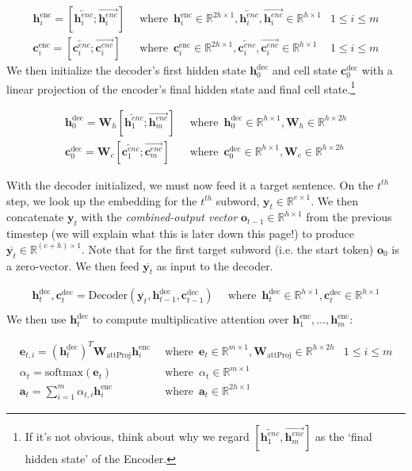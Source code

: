\documentclass{assignment format}
\newcommand{\Real}{\mathbb{R}}
\newcommand{\henc}{\mathbf{h}^{\text{enc}}}
\newcommand{\hencfw}[1]{\overrightarrow{\mathbf{h}^{enc}_{#1}}}
\newcommand{\hencbw}[1]{\overleftarrow{\mathbf{h}^{enc}_{#1}}}
\newcommand{\cenc}{\mathbf{c}^{\text{enc}}}
\newcommand{\cencfw}[1]{\overrightarrow{\mathbf{c}^{enc}_{#1}}}
\newcommand{\cencbw}[1]{\overleftarrow{\mathbf{c}^{enc}_{#1}}}
\newcommand{\hdec}{\mathbf{h}^{\text{dec}}}
\newcommand{\cdec}{\mathbf{c}^{\text{dec}}}
\begin{document}
\begin{align}
    \henc_i = [\hencbw{i}; \hencfw{i}] \enspace &\text{where}\enspace \henc_i \in \Real^{2h \times 1}, \hencbw{i}, \hencfw{i} \in \Real^{h \times 1} &1 \le i \le m \\
    \cenc_i = [\cencbw{i}; \cencfw{i}] \enspace &\text{where} \enspace \cenc_i \in \Real^{2h \times 1}, \cencbw{i}, \cencfw{i} \in \Real^{h \times 1} &1 \le i \le m
\end{align}
We then initialize the decoder's first hidden state $\hdec_0$ and cell state $\cdec_0$ with a linear projection of the encoder's final hidden state and final cell state.\footnote{If it's not obvious, think about why we regard $[\hencbw{1}, \hencfw{m}]$ as the `final hidden state' of the Encoder.} 

\begin{align}
    \hdec_0 = \mathbf{W}_{h}[\hencbw{1}; \hencfw{m}] \enspace &\text{where} \enspace \hdec_0 \in \Real^{h \times 1}, \mathbf{W}_{h} \in \Real^{h \times 2h}\\
    \cdec_0 = \mathbf{W}_{c}[\cencbw{1}; \cencfw{m}] \enspace &\text{where} \enspace \cdec_0 \in \Real^{h \times 1}, \mathbf{W}_{c} \in \Real^{h \times 2h}
\end{align}


With the decoder initialized, we must now feed it a target sentence. On the $t^{th}$ step, we look up the embedding for the $t^{th}$ subword,  $\mathbf{y}_t \in \Real^{e \times 1}$. We then concatenate $\mathbf{y}_t$ with the \textit{combined-output vector} $\mathbf{o}_{t-1} \in \Real^{h \times 1}$ from the previous timestep (we will explain what this is later down this page!\@) to produce $\overline{\mathbf{y}_t} \in \Real^{(e+h) \times 1}$. Note that for the first target subword (i.e. the start token) $\mathbf{o}_{0}$ is a zero-vector. We then feed $\overline{\mathbf{y}_t}$ as input to the decoder. 

\begin{align}
    \hdec_t, \cdec_t = \text{Decoder}(\overline{\mathbf{y}_t}, \hdec_{t-1}, \cdec_{t-1}) \enspace &\text{where} \enspace \hdec_t \in \Real^{h \times 1}, \cdec_t \in \Real^{h \times 1}\\
\end{align}
We then use $\hdec_t$ to compute  multiplicative attention over $\henc_1, \dots, \henc_m$:

\begin{align}
    \mathbf{e}_{t, i} = (\hdec_t)^T\mathbf{W}_{\text{attProj}}\henc_i \enspace &\text{where} \enspace \mathbf{e}_{t} \in \Real^{m \times 1}, \mathbf{W}_{\text{attProj}}\in \Real^{h \times 2h} & 1 \le i \le m \\
    \alpha_t= \text{softmax}(\mathbf{e}_t) \enspace &\text{where} \enspace \alpha_t \in \Real^{m \times 1}\\
    \mathbf{a}_t = \sum_{i=1}^{m}\alpha_{t,i}\henc_i \enspace &\text{where} \enspace \mathbf{a}_t \in \Real^{2h \times 1}
\end{align}
 
\end{document}
